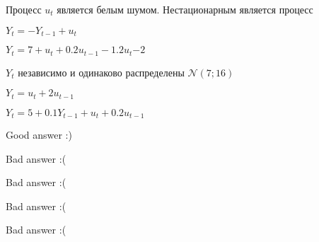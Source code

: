 
\begin{question}
Процесс \(u_t\) является белым шумом. Нестационарным является процесс
\begin{answerlist}
  \item \(Y_t = - Y_{t-1} + u_t\)
  \item \(Y_t = 7 + u_t + 0.2 u_{t-1} - 1.2 u_t{-2}\)
  \item \(Y_t\) независимо и одинаково распределены \(\mathcal{N}(7; 16)\)
  \item \(Y_t = u_t + 2u_{t-1}\)
  \item \(Y_t = 5 + 0.1 Y_{t-1} + u_{t} + 0.2 u_{t-1}\)
\end{answerlist}
\end{question}

\begin{solution}
\begin{answerlist}
  \item Good answer :)
  \item Bad answer :(
  \item Bad answer :(
  \item Bad answer :(
  \item Bad answer :(
\end{answerlist}
\end{solution}

